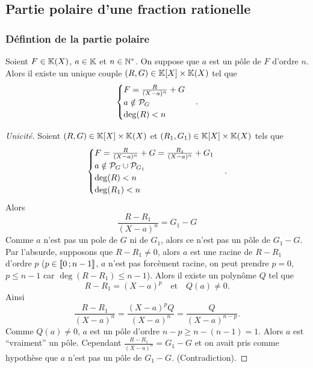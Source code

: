 \subsection{Partie polaire d'une fraction rationelle}

\subsubsection{Défintion de la partie polaire}

\begin{lemme}
  Soient \(F \in \K(X)\), \(a \in \K\) et \(n \in \N^*\). On suppose que \(a\) est un pôle de \(F\) d'ordre \(n\). Alors il existe un unique couple \((R,G) \in \K[X] \times \K(X)\) tel que
  \begin{equation}
    \begin{cases} F = \frac{R}{(X-a)^n} +G \\ a\notin \P_G \\ \deg(R)<n \end{cases}.
  \end{equation}
\end{lemme}
\begin{proof}[Unicité]
  Soient \((R,G) \in \K[X] \times \K(X)\) et \((R_1,G_1) \in \K[X] \times \K(X)\) tels que
\begin{equation}
    \begin{cases} F = \frac{R}{(X-a)^n} +G=\frac{R_1}{(X-a)^n} +G_1 \\ a\notin \P_G\cup\P_{G_1} \\ \deg(R)<n \\ \deg(R_1)<n \end{cases}.
  \end{equation}
  Alors
  \begin{equation}
    \frac{R-R_1}{(X-a)^n}=G_1-G
  \end{equation}
  Comme \(a\) n'est pas un pole de \(G\) ni de \(G_1\), alors ce n'est pas un pôle de \(G_1-G\). Par l'absurde, supposons que \(R-R_1\neq 0\), alors \(a\) est une racine de \(R-R_1\) d'ordre \(p\) (\(p \in \intervalleentier{0}{n-1}\), \(a\) n'est pas forcèment racine, on peut prendre \(p=0\), \(p\leqslant n-1\) car \(\deg(R-R_1)\leqslant n-1\)). Alors il existe un polynôme \(Q\) tel que
  \begin{equation}
    R-R_1=(X-a)^p \quad \text{et} \quad Q(a)\neq 0.
  \end{equation}
Ainsi
\begin{equation}
  \frac{R-R_1}{(X-a)^n} = \frac{(X-a)^pQ}{(X-a)^n} = \frac{Q}{(X-a)^{n-p}}.
\end{equation}
Comme \(Q(a)\neq 0\), \(a\) est un pôle d'ordre \(n-p\geqslant n-(n-1)=1\). Alors \(a\) est ``vraiment'' un pôle. Cependant \(\frac{R-R_1}{(X-a)^n}=G_1-G\) et on avait pris comme hypothèse que \(a\) n'est pas un pôle de \(G_1-G\). (Contradiction).
\end{proof}
